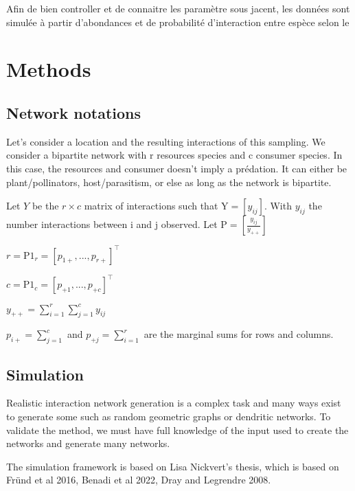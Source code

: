 \documentclass{article}
\begin{document}
Afin de bien controller et de connaitre les paramètre sous jacent, les données sont simulée à partir d'abondances et de probabilité d'interaction entre espèce selon le  










\section{Methods}

\subsection{Network notations}
Let's consider a location and the resulting interactions of this sampling. We consider a bipartite network with r resources species and c consumer species. In this case, the resources and consumer doesn't imply a prédation. It can either be plant/pollinators, host/parasitism, or else as long as the network is bipartite. 

Let $Y$ be the $r\times c$ matrix of interactions such that $\textrm{Y} = [y_{ij}]$. With $y_{ij}$ the number interactions between i and j observed.
Let $\textrm{P}=[\frac{y_{ij}}{y_{++}}]$

$r=\textrm{P1}_r =[p_{1+}, ..., p_{r+}]^\intercal$

$c=\textrm{P1}_c=[p_{+1}, ..., p_{+c}]^\intercal$

$y_{++}=\sum_{i=1}^{r}\sum_{j=1}^{c}y_{ij}$

$p_{i+}=\sum_{j=1}^{c}$ and $p_{+j}=\sum_{i=1}^{r}$ are the marginal sums for rows and columns.














\subsection{Simulation}

Realistic interaction network generation is a complex task and many ways exist to generate some such as random geometric graphs or dendritic networks. To validate the method, we must have full knowledge of the input used to create the networks and generate many networks.

The simulation framework is based on Lisa Nickvert's thesis, which is based on Fründ et al 2016, Benadi et al 2022, Dray and Legrendre 2008.
\end{document}

